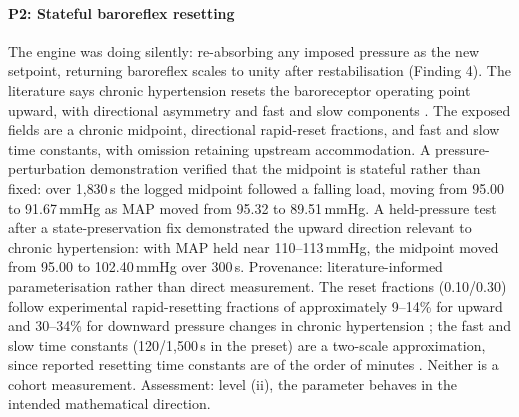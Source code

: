 \documentclass[preprint,12pt,nopreprintline]{elsarticle}
\begin{document}
\paragraph{P2: Stateful baroreflex resetting} The engine was doing silently: re-absorbing any imposed pressure as the new setpoint, returning baroreflex scales to unity after restabilisation (Finding 4). The literature says chronic hypertension resets the baroreceptor operating point upward, with directional asymmetry and fast and slow components \cite{xie1991,munch1983}. The exposed fields are a chronic midpoint, directional rapid-reset fractions, and fast and slow time constants, with omission retaining upstream accommodation. A pressure-perturbation demonstration verified that the midpoint is stateful rather than fixed: over 1{,}830\,s the logged midpoint followed a falling load, moving from 95.00 to 91.67\,mmHg as MAP moved from 95.32 to 89.51\,mmHg. A held-pressure test after a state-preservation fix demonstrated the upward direction relevant to chronic hypertension: with MAP held near 110--113\,mmHg, the midpoint moved from 95.00 to 102.40\,mmHg over 300\,s. Provenance: literature-informed parameterisation rather than direct measurement. The reset fractions (0.10/0.30) follow experimental rapid-resetting fractions of approximately 9--14\% for upward and 30--34\% for downward pressure changes in chronic hypertension \cite{xie1991}; the fast and slow time constants (120/1{,}500\,s in the preset) are a two-scale approximation, since reported resetting time constants are of the order of minutes \cite{munch1983}. Neither is a cohort measurement. Assessment: level (ii), the parameter behaves in the intended mathematical direction.
\end{document}
